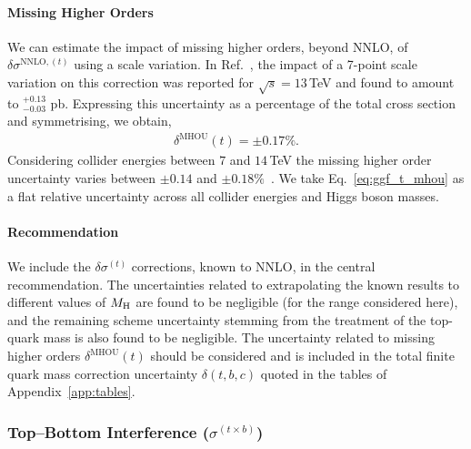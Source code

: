 \paragraph{Missing Higher Orders}
We can estimate the impact of missing higher orders, beyond NNLO, of $\delta \sigma^{\mathrm{NNLO}, (t)}$ using a scale variation.
In Ref.~\cite{Czakon:2023kqm}, the impact of a 7-point scale variation on this correction was reported for $\sqrt{s}=13$\,TeV and found to amount to $^{+0.13}_{-0.03}$ pb.
Expressing this uncertainty as a percentage of the total cross section and symmetrising, we obtain,
\begin{align}
\delta^{\mathrm{MHOU}}(t) = \pm 0.17 \%. \label{eq:ggf_t_mhou}
\end{align}
Considering collider energies between $7$ and $14$\,TeV the missing higher order uncertainty varies between $\pm 0.14$ and $\pm 0.18\%$~\cite{Czakon:2023kqm}. 
We take Eq.~\eqref{eq:ggf_t_mhou} as a flat relative uncertainty across all collider energies and Higgs boson masses.

\paragraph{Recommendation}
We include the $\delta \sigma^{(t)}$ corrections, known to NNLO, in the central recommendation.
The uncertainties related to extrapolating the known results to different values of $M_\mathrm{H}$ are found to be negligible (for the range considered here), and the remaining scheme uncertainty stemming from the treatment of the top-quark mass is also found to be negligible.
The uncertainty related to missing higher orders $\delta^{\mathrm{MHOU}}(t)$ should be considered and is included in the total finite quark mass correction uncertainty $\delta(t,b,c)$ quoted in the tables of Appendix~\ref{app:tables}.


\subsubsection{Top--Bottom Interference ($\sigma^{(t \times b)}$)}
\label{sec:ggf_mbmt}

